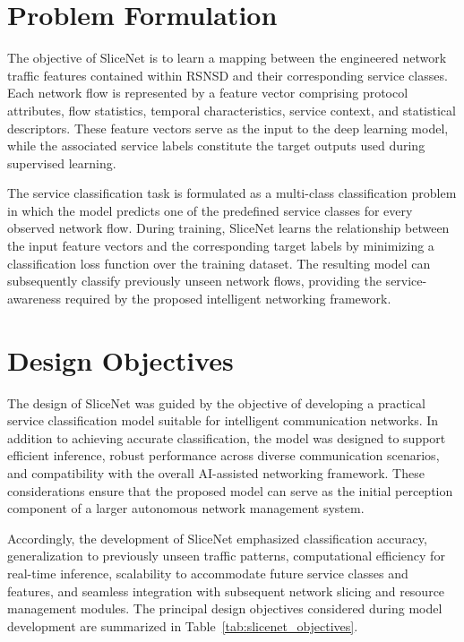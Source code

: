 \documentclass[12pt,a4paper]{report}
\begin{document}
	\section{Problem Formulation}
	\label{sec:problem}
	
	The objective of SliceNet is to learn a mapping between the engineered network traffic features contained within RSNSD and their corresponding service classes. Each network flow is represented by a feature vector comprising protocol attributes, flow statistics, temporal characteristics, service context, and statistical descriptors. These feature vectors serve as the input to the deep learning model, while the associated service labels constitute the target outputs used during supervised learning.
	
	The service classification task is formulated as a multi-class classification problem in which the model predicts one of the predefined service classes for every observed network flow. During training, SliceNet learns the relationship between the input feature vectors and the corresponding target labels by minimizing a classification loss function over the training dataset. The resulting model can subsequently classify previously unseen network flows, providing the service-awareness required by the proposed intelligent networking framework.
	
	
	
\section{Design Objectives}
\label{sec:design_objectives}

The design of SliceNet was guided by the objective of developing a practical service classification model suitable for intelligent communication networks. In addition to achieving accurate classification, the model was designed to support efficient inference, robust performance across diverse communication scenarios, and compatibility with the overall AI-assisted networking framework. These considerations ensure that the proposed model can serve as the initial perception component of a larger autonomous network management system.

Accordingly, the development of SliceNet emphasized classification accuracy, generalization to previously unseen traffic patterns, computational efficiency for real-time inference, scalability to accommodate future service classes and features, and seamless integration with subsequent network slicing and resource management modules. The principal design objectives considered during model development are summarized in Table~\ref{tab:slicenet_objectives}.
\end{document}
